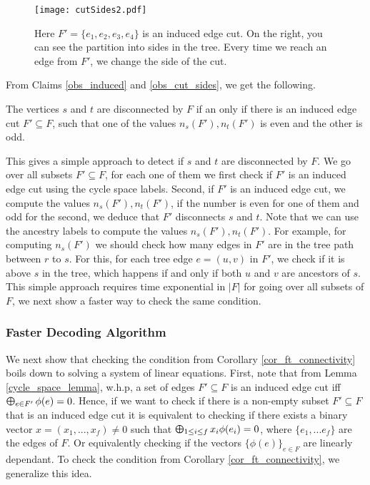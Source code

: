 \setlength{\intextsep}{0pt}
\begin{figure}[h]
\centering
\setlength{\abovecaptionskip}{-2pt}
\setlength{\belowcaptionskip}{6pt}
\texttt{[image: cutSides2.pdf]}
 \caption{Here $F'=\{e_1,e_2,e_3,e_4\}$ is an induced edge cut. On the right, you can see the partition into sides in the tree. Every time we reach an edge from $F'$, we change the side of the cut.}
\label{cutSidesPic}
\end{figure}

From Claims \ref{obs_induced} and \ref{obs_cut_sides}, we get the following.

\begin{corollary} \label{cor_ft_connectivity}
The vertices $s$ and $t$ are disconnected by $F$ if an only if there is an induced edge cut $F' \subseteq F$, such that one of the values $n_s(F'),n_t(F')$ is even and the other is odd. 
\end{corollary}

This gives a simple approach to detect if $s$ and $t$ are disconnected by $F$. We go over all subsets $F' \subseteq F$, for each one of them we first check if $F'$ is an induced edge cut using the cycle space labels. Second, if $F'$ is an induced edge cut, we compute the values $n_s(F'),n_t(F')$, if the number is even for one of them and odd for the second, we deduce that $F'$ disconnects $s$ and $t$. Note that we can use the ancestry labels to compute the values $n_s(F'),n_t(F')$. For example, for computing $n_s(F')$ we should check how many edges in $F'$ are in the tree path between $r$ to $s$. For this, for each tree edge $e=(u,v)$ in $F'$, we check if it is above $s$ in the tree, which happens if and only if both $u$ and $v$ are ancestors of $s$.
This simple approach requires time exponential in $|F|$ for going over all subsets of $F$, we next show a faster way to check the same condition.

\subsubsection{Faster Decoding Algorithm}

We next show that checking the condition from Corollary \ref{cor_ft_connectivity} boils down to solving a system of linear equations.
First, note that from Lemma \ref{cycle_space_lemma}, w.h.p, a set of edges $F' \subseteq F$ is an induced edge cut iff $\Moplus_{e \in F'} \phi(e) = 0$. Hence, if we want to check if there is a non-empty subset $F' \subseteq F$ that is an induced edge cut it is equivalent to checking if there exists a binary vector $x=(x_1,...,x_f) \neq 0$ such that $\Moplus_{1 \leq i \leq f} x_i \phi(e_i) = 0$, where $\{e_1,...e_f\}$ are the edges of $F$. Or equivalently checking if the vectors $\{\phi(e)\}_{e \in F}$ are linearly dependant. To check the condition from Corollary \ref{cor_ft_connectivity}, we generalize this idea. 

